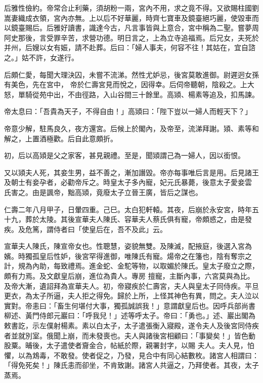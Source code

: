\begin{pinyinscope}
 后雅性儉約。帝常合止利藥，須胡粉一兩，宮內不用，求之竟不得。又欲賜柱國劉嵩妻織成衣領，宮內亦無。上以后不好華麗，時齊七寶車及鏡臺絕巧麗，使毀車而以鏡臺賜后。后雅好讀書，識達今古，凡言事皆與上意合，宮中稱為二聖。嘗夢周阿史那後，言受罪辛苦，求營功德。明日言之，上為立寺追福焉。后兄女，夫死於并州，后嫂以女有娠，請不赴葬。后曰：「婦人事夫，何容不往！其姑在，宜自諮之。」姑不許，女遂行。



 后頗仁愛，每聞大理決囚，未嘗不流涕。然性尤妒忌，後宮莫敢進御。尉遲迥女孫有美色，先在宮中，
 帝於仁壽宮見而悅之，因得幸。后伺帝聽朝，陰殺之。上大怒，單騎從苑中出，不由徑路，入山谷間三十餘里。高熲、楊素等追及，扣馬諫。



 帝太息曰：「吾貴為天子，不得自由！」高熲曰：「陛下豈以一婦人而輕天下？」



 帝意少解，駐馬良久，夜方還宮。后候上於閣內，及帝至，流涕拜謝。熲、素等和解之，上置酒極歡。后自此意頗折。



 初，后以高熲是父之家客，甚見親禮。至是，聞熲謂己為一婦人，因以銜恨。



 又以熲夫人死，其妾生男，益不善之，漸加譖毀。帝亦每事唯后言是用。后見諸王及朝士有妾孕者，必勸帝斥之。時皇太子多內寵，妃元氏暴薨，後意太子愛妾雲
 氏害之。由是諷帝，黜高熲，竟廢太子立晉王廣，皆后之謀也。



 仁壽二年八月甲子，日暈四重。己巳。太白犯軒轅。其夜，后崩於永安宮，時年五十九，葬於太陵。其後宣華夫人陳氏、容華夫人蔡氏俱有寵，帝頗惑之，由是發疾。及危篤，謂侍者曰「使皇后在，吾不及此」云。



 宣華夫人陳氏，陳宣帝女也。性聰慧，姿貌無雙。及陳滅，配掖庭，後選入宮為嬪。時獨孤皇后性妒，後宮罕得進御，唯陳氏有寵。煬帝之在籓也，陰有奪宗之計，規為內助，每致禮焉。進金蛇、金駝等物，以取媚於陳氏。皇太子廢立之際，頗有力焉。及文獻皇后崩，進位為貴人。專房
 擅寵，主斷內事，六宮莫與為比。及帝大漸，遺詔拜為宣華夫人。初，帝寢疾於仁壽宮，夫人與皇太子同侍疾。平旦更衣，為太子所逼，夫人拒之得免。歸於上所，上怪其神色有異，問之。夫人泣以實對。帝恚曰：「畜生何堪付大事，獨孤誠誤我！」意謂獻皇后也。因呼兵部尚書柳述、黃門侍郎元巖曰：「呼我兒！」述等呼太子。帝曰：「勇也。」述、巖出閣為敕書訖，示左僕射楊素。素以白太子，太子遣張衡入寢殿，遂令夫人及後宮同侍疾者並就別室。俄聞上崩，而未發喪也。夫人與諸後宮相顧曰：「事變矣！」皆色動股粟。晡後，太子遣使者齎金合，帖紙於際，親署封字，以賜
 夫人。夫人見，怕懼，以為鴆毒，不敢發。使者促之，乃發，見合中有同心結數枚。諸宮人相謂曰：「得免死矣！」陳氏恚而卻坐，不肯致謝。諸宮人共逼之，乃拜使者。其夜，太子蒸焉。




\end{pinyinscope}
